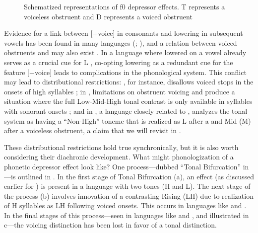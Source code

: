 \documentclass[output=paper,newtxmath,modfonts,nonflat,hidelinks]{langsci/langscibook}
\begin{document}
\begin{figure}  
\caption{\label{fig:lotven:samson:1} Schematized representations of f0   depressor effects. T represents a voiceless obstruent and D represents a voiced obstruent}
\end{figure}


Evidence for a link between [+voice] in consonants and  lowering in subsequent vowels has been found in many languages (\citealt{Bradshaw1999}; \citealt{Tang2008}), and a relation between voiced obstruents and  may also exist \citep[5]{Yip2002}. In a  language where lowered  on a vowel already serves as a crucial cue for L , co-opting  lowering as a redundant cue for the feature [+voice] leads to complications in the phonological system. This conflict may lead to distributional restrictions: , for instance, disallows voiced stops in the onsets of high  syllables \citep{perkins2011}; in , limitations on obstruent voicing and  produce a situation where the full Low-Mid-High tonal contrast is only available in syllables with sonorant onsets \citep{Pearce2005}; and in , a language closely related to , \citet{Ansre1961} analyzes the tonal system as having a “Non-High” toneme that is realized as L after a  and Mid (M) after a voiceless obstruent, a claim that we will revisit in . 

These distributional restrictions hold true synchronically, but it is also worth considering their diachronic development. What might phonologization of a phonetic depressor effect look like? One process—dubbed “Tonal Bifurcation” in \citet{Hyman2013enlarging}—is outlined in . In the first stage of Tonal Bifurcation (a), an  effect (as discussed earlier for ) is present in a language with two  tones (H and L). The next stage of the process (b) involves innovation of a contrasting Rising (LH)  due to realization of H  syllables as LH following voiced onsets. This occurs in languages like  and  \citep{Ansre1961,Bole-Richard1983}. In the final stages of this process—seen in languages like  and  \citep{Downing2009}, and illustrated in c—the voicing distinction has been lost in favor of a tonal distinction.
\end{document}
